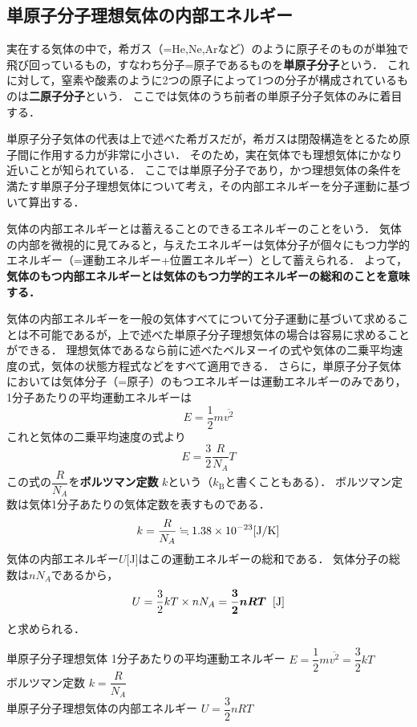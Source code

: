  \subsection{単原子分子理想気体の内部エネルギー}
 
 実在する気体の中で，希ガス（=He,\hspace{1mm}Ne,\hspace{1mm}Arなど）のように原子そのものが単独で飛び回っているもの，すなわち分子=原子であるものを{\bf 単原子分子}という．
 これに対して，窒素や酸素のように2つの原子によって1つの分子が構成されているものは{\bf 二原子分子}という．
 ここでは気体のうち前者の単原子分子気体のみに着目する．
 
 単原子分子気体の代表は上で述べた希ガスだが，希ガスは閉殻構造をとるため原子間に作用する力が非常に小さい．
 そのため，実在気体でも理想気体にかなり近いことが知られている．
 ここでは単原子分子であり，かつ理想気体の条件を満たす単原子分子理想気体について考え，その内部エネルギーを分子運動に基づいて算出する．
 
 気体の内部エネルギーとは蓄えることのできるエネルギーのことをいう．
 気体の内部を微視的に見てみると，与えたエネルギーは気体分子が個々にもつ力学的エネルギー（=運動エネルギー+位置エネルギー）として蓄えられる．
 よって，{\bf 気体のもつ内部エネルギーとは気体のもつ力学的エネルギーの総和のことを意味する．}
 
 気体の内部エネルギーを一般の気体すべてについて分子運動に基づいて求めることは不可能であるが，上で述べた単原子分子理想気体の場合は容易に求めることができる．
 理想気体であるなら前に述べたベルヌーイの式や気体の二乗平均速度の式，気体の状態方程式などをすべて適用できる．
 さらに，単原子分子気体においては気体分子（=原子）のもつエネルギーは運動エネルギーのみであり，1分子あたりの平均運動エネルギーは
 \[E=\dfrac{1}{2}m\overline{v^2}\]
 これと気体の二乗平均速度の式より
 \[E=\dfrac{3}{2}\dfrac{R}{N_A}T\]
 この式の$\dfrac{R}{N_A}$を{\bf ボルツマン定数} \mbox{\boldmath $k$}という（$k_{\mathrm{B}}$と書くこともある）．
 ボルツマン定数は気体1分子あたりの気体定数を表すものである．
 \[k=\dfrac{R}{N_A} \fallingdotseq 1.38\times10^{-23}[{\rm J/K}]\]
 気体の内部エネルギー$U$[J]はこの運動エネルギーの総和である．
 気体分子の総数は$nN_A$であるから，
 \[ U=\dfrac{3}{2}kT\times nN_A =\mbox{\boldmath $\dfrac{3}{2}nRT$} \hspace{2mm}[{\rm J}]\]
 と求められる．
 
 \begin{matome}{単原子分子理想気体}
 \hspace{3mm} 1分子あたりの平均運動エネルギー\hspace{11mm} $E=\dfrac{1}{2}m\overline{v^2}=\dfrac{3}{2}kT$\\
 \hspace{3mm} ボルツマン定数\hspace{40mm} $k=\dfrac{R}{N_A}$\\
 \hspace{3mm} 単原子分子理想気体の内部エネルギー\hspace{8mm} $U=\dfrac{3}{2}nRT$ 
 \end{matome}
 

